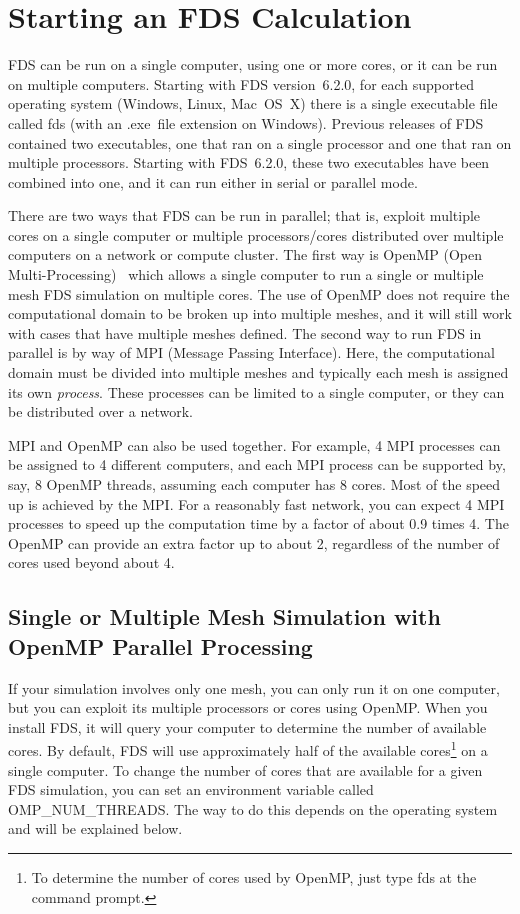 \documentclass[11pt]{book}
\begin{document}
\section{Starting an FDS Calculation}

FDS can be run on a single computer, using one or more cores, or it can be run on multiple computers. Starting with FDS version~6.2.0, for each supported operating system (Windows, Linux, Mac~OS~X) there is a single executable file called {\ct fds} (with an {\ct .exe}\ file extension on Windows). Previous releases of FDS contained two executables, one that ran on a single processor and one that ran on multiple processors. Starting with FDS~6.2.0, these two executables have been combined into one, and it can run either in serial or parallel mode.

There are two ways that FDS can be run in parallel; that is, exploit multiple cores on a single computer or multiple processors/cores distributed over multiple computers on a network or compute cluster. The first way is OpenMP (Open Multi-Processing)~\cite{Chapman:OpenMP} which allows a single computer to run a single or multiple mesh FDS simulation on multiple cores. The use of OpenMP does not require the computational domain to be broken up into multiple meshes, and it will still work with cases that have multiple meshes defined. The second way to run FDS in parallel is by way of MPI (Message Passing Interface). Here, the computational domain must be divided into multiple meshes and typically each mesh is assigned its own {\em process}. These processes can be limited to a single computer, or they can be distributed over a network.

MPI and OpenMP can also be used together. For example, 4 MPI processes can be assigned to 4 different computers, and each MPI process can be supported by, say, 8 OpenMP threads, assuming each computer has 8 cores. Most of the speed up is achieved by the MPI. For a reasonably fast network, you can expect 4 MPI processes to speed up the computation time by a factor of about 0.9 times 4. The OpenMP can provide an extra factor up to about 2, regardless of the number of cores used beyond about 4.

\subsection{Single or Multiple Mesh Simulation with OpenMP Parallel Processing}
\label{single_mesh}

If your simulation involves only one mesh, you can only run it on one computer, but you can exploit its multiple processors or cores using OpenMP. When you install FDS, it will query your computer to determine the number of available cores. By default, FDS will use approximately half of the available cores\footnote{To determine the number of cores used by OpenMP, just type {\ct fds} at the command prompt.} on a single computer. To change the number of cores that are available for a given FDS simulation, you can set an environment variable called {\ct OMP\_NUM\_THREADS}. The way to do this depends on the operating system and will be explained below.
\end{document}
